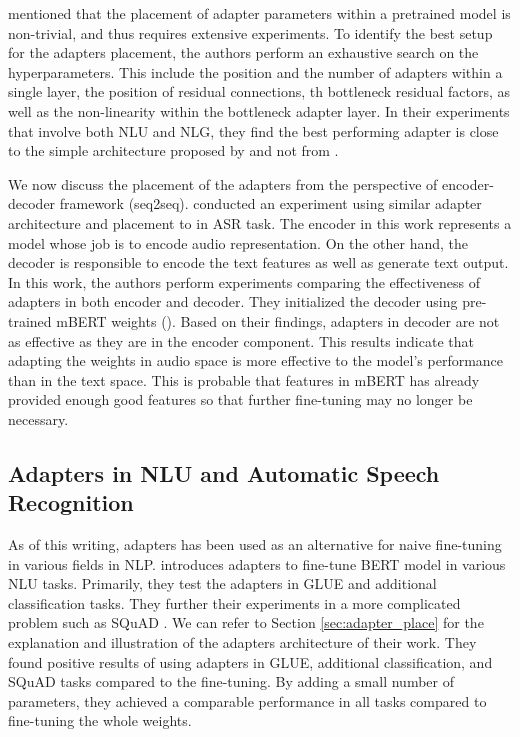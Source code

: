 \cite{pfeiffer2021adapterfusion} mentioned that the placement of adapter parameters within a pretrained model is non-trivial, and thus requires extensive experiments. To identify the best setup for the adapters placement, the authors perform an exhaustive search on the hyperparameters. This include the position and the number of adapters within a single layer, the position of residual connections, th bottleneck residual factors, as well as the non-linearity within the bottleneck adapter layer. In their experiments that involve both NLU and NLG, they find the best performing adapter is close to the simple architecture proposed by \cite{bapna2019simple} and not from \cite{houlsby2019parameter}.

We now discuss the placement of the adapters from the perspective of encoder-decoder framework (seq2seq). \cite{winata2020adapt} conducted an experiment using similar adapter architecture and placement to \cite{bapna2019simple} in ASR task. The encoder in this work represents a model whose job is to encode audio representation. On the other hand, the decoder is responsible to encode the text features as well as generate text output. In this work, the authors perform experiments comparing the effectiveness of adapters in both encoder and decoder. They initialized the decoder using pre-trained mBERT weights (\cite{devlin2018bert}). Based on their findings, adapters in decoder are not as effective as they are in the encoder component. This results indicate that adapting the weights in audio space is more effective to the model's performance than in the text space. This is probable that features in mBERT has already provided enough good features so that further fine-tuning may no longer be necessary.

\subsection{Adapters in NLU and Automatic Speech Recognition}
\label{sec:app_nlu_asr}
As of this writing, adapters has been used as an alternative for naive fine-tuning in various fields in NLP. \cite{houlsby2019parameter} introduces adapters to fine-tune BERT model in various NLU tasks. Primarily, they test the adapters in GLUE \cite{wang2018glue} and additional classification tasks. They further their experiments in a more complicated problem such as SQuAD \cite{rajpurkar2018know}. We can refer to Section \ref{sec:adapter_place} for the explanation and illustration of the adapters architecture of their work. They found positive results of using adapters in GLUE, additional classification, and SQuAD tasks compared to the fine-tuning. By adding a small number of parameters, they achieved a comparable performance in all tasks compared to fine-tuning the whole weights.

